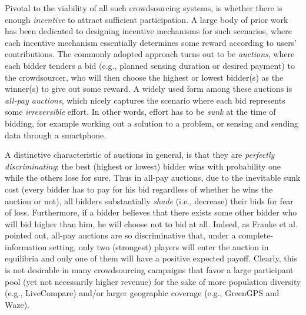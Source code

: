 \documentclass{sig-alternate-10pt}
\begin{document}
Pivotal to the viability of all such crowdsourcing systems, is whether there is enough {\em incentive} to attract sufficient participation. A large body of prior work \cite{yang12mobicom,kout13infocom,luo14infocom,DV09csallpay,AS09ICIS,SODA12,luo14mass,luo12secon} 
has been dedicated to designing incentive mechanisms for such scenarios, where each incentive mechanism essentially determines some reward according to users' contributions.
The commonly adopted approach turns out to be {\em auctions}, where each bidder tenders a bid (e.g., planned sensing duration\cite{yang12mobicom} or desired payment\cite{kout13infocom}) to the crowdsourcer, who will then choose the highest or lowest bidder(s) as the winner(s) to give out some reward. A widely used form among these auctions is {\em all-pay auctions}\cite{DV09csallpay,AS09ICIS,SODA12,luo14infocom,luo14mass}, which nicely captures the scenario where each bid represents some {\em irreversible} effort. In other words, effort has to be {\em sunk} at the time of bidding, for example working out a solution to a problem, or sensing and sending data through a smartphone.



A distinctive characteristic of auctions in general, is that they are {\em perfectly discriminating}\cite{Hillman89}: the best (highest or lowest) bidder wins with probability one while the others lose for sure. Thus in all-pay auctions, due to the inevitable sunk cost (every bidder has to pay for his bid regardless of whether he wins the auction or not), all bidders substantially {\em shade} (i.e., decrease) their bids for fear of loss\cite{Krishna09}.  Furthermore, if a bidder believes that there exists some other bidder who will bid higher than him, he will choose not to bid at all.  Indeed, as Franke et al. \cite{Franke14} pointed out, all-pay auctions are so discriminative that, under a complete-information setting, only two (strongest) players will enter the auction in equilibria and only one of them will have a positive expected payoff.
Clearly, this is not desirable in many crowdsourcing campaigns that favor a large participant pool (yet not necessarily higher revenue) for the sake of more population diversity (e.g., LiveCompare\cite{livecomp09}) and/or larger geographic coverage (e.g., GreenGPS\cite{greengps10mobisys} and Waze).
\end{document}

